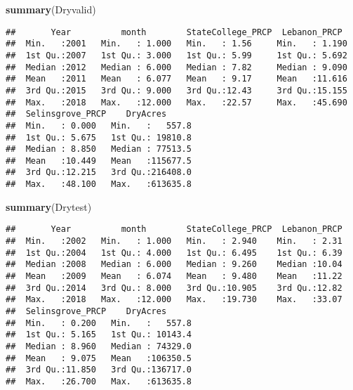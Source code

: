 \documentclass[]{article}
\newenvironment{Shaded}{\begin{snugshade}}{\end{snugshade}}
\newcommand{\KeywordTok}[1]{\textcolor[rgb]{0.13,0.29,0.53}{\textbf{{#1}}}}
\newcommand{\DataTypeTok}[1]{\textcolor[rgb]{0.13,0.29,0.53}{{#1}}}
\newcommand{\DecValTok}[1]{\textcolor[rgb]{0.00,0.00,0.81}{{#1}}}
\newcommand{\StringTok}[1]{\textcolor[rgb]{0.31,0.60,0.02}{{#1}}}
\newcommand{\CommentTok}[1]{\textcolor[rgb]{0.56,0.35,0.01}{\textit{{#1}}}}
\newcommand{\OtherTok}[1]{\textcolor[rgb]{0.56,0.35,0.01}{{#1}}}
\newcommand{\NormalTok}[1]{{#1}}
\begin{document}
\begin{Shaded}
\begin{Highlighting}[]
\KeywordTok{summary}\NormalTok{(Dryvalid)}
\end{Highlighting}
\end{Shaded}

\begin{verbatim}
##       Year          month        StateCollege_PRCP  Lebanon_PRCP   
##  Min.   :2001   Min.   : 1.000   Min.   : 1.56     Min.   : 1.190  
##  1st Qu.:2007   1st Qu.: 3.000   1st Qu.: 5.99     1st Qu.: 5.692  
##  Median :2012   Median : 6.000   Median : 7.82     Median : 9.090  
##  Mean   :2011   Mean   : 6.077   Mean   : 9.17     Mean   :11.616  
##  3rd Qu.:2015   3rd Qu.: 9.000   3rd Qu.:12.43     3rd Qu.:15.155  
##  Max.   :2018   Max.   :12.000   Max.   :22.57     Max.   :45.690  
##  Selinsgrove_PRCP    DryAcres       
##  Min.   : 0.000   Min.   :   557.8  
##  1st Qu.: 5.675   1st Qu.: 19810.8  
##  Median : 8.850   Median : 77513.5  
##  Mean   :10.449   Mean   :115677.5  
##  3rd Qu.:12.215   3rd Qu.:216408.0  
##  Max.   :48.100   Max.   :613635.8
\end{verbatim}

\begin{Shaded}
\begin{Highlighting}[]
\KeywordTok{summary}\NormalTok{(Drytest)}
\end{Highlighting}
\end{Shaded}

\begin{verbatim}
##       Year          month        StateCollege_PRCP  Lebanon_PRCP  
##  Min.   :2002   Min.   : 1.000   Min.   : 2.940    Min.   : 2.31  
##  1st Qu.:2004   1st Qu.: 4.000   1st Qu.: 6.495    1st Qu.: 6.39  
##  Median :2008   Median : 6.000   Median : 9.260    Median :10.04  
##  Mean   :2009   Mean   : 6.074   Mean   : 9.480    Mean   :11.22  
##  3rd Qu.:2014   3rd Qu.: 8.000   3rd Qu.:10.905    3rd Qu.:12.82  
##  Max.   :2018   Max.   :12.000   Max.   :19.730    Max.   :33.07  
##  Selinsgrove_PRCP    DryAcres       
##  Min.   : 0.200   Min.   :   557.8  
##  1st Qu.: 5.165   1st Qu.: 10143.4  
##  Median : 8.960   Median : 74329.0  
##  Mean   : 9.075   Mean   :106350.5  
##  3rd Qu.:11.850   3rd Qu.:136717.0  
##  Max.   :26.700   Max.   :613635.8
\end{verbatim}

\begin{Shaded}
\end{Shaded}
\end{document}
